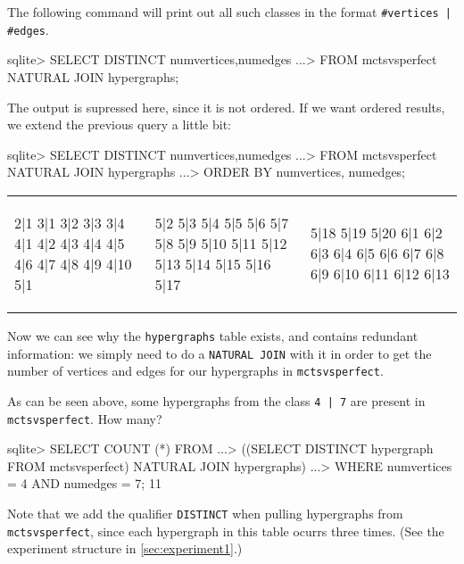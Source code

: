 The following command will print out all such classes in the format \texttt{\#vertices | \#edges}.
\begin{code}
sqlite> SELECT DISTINCT numvertices,numedges
   ...> FROM mctsvsperfect NATURAL JOIN hypergraphs;
\end{code}
The output is supressed here, since it is not ordered.
If we want ordered results, we extend the previous query a little bit:
\begin{code}
sqlite> SELECT DISTINCT numvertices,numedges
   ...> FROM mctsvsperfect NATURAL JOIN hypergraphs
   ...> ORDER BY numvertices, numedges;
\end{code}

\begin{tabular}{| p{0.5in} | p{0.5in} | p{0.5in} |}
\begin{minipage}{0.5in}
\begin{datalisting}
2|1
3|1
3|2
3|3
3|4
4|1
4|2
4|3
4|4
4|5
4|6
4|7
4|8
4|9
4|10
5|1
\end{datalisting}
\end{minipage}
&
\begin{minipage}{0.5in}
\begin{datalisting}
5|2
5|3
5|4
5|5
5|6
5|7
5|8
5|9
5|10
5|11
5|12
5|13
5|14
5|15
5|16
5|17
\end{datalisting}
\end{minipage}
&
\begin{minipage}{0.5in}
\begin{datalisting}
5|18
5|19
5|20
6|1
6|2
6|3
6|4
6|5
6|6
6|7
6|8
6|9
6|10
6|11
6|12
6|13
\end{datalisting}
\end{minipage}
\\
\end{tabular}

Now we can see why the \texttt{hypergraphs} table exists, and contains redundant information: we simply need to do a \texttt{NATURAL JOIN} with it in order to get the number of vertices and edges for our hypergraphs in \texttt{mctsvsperfect}.

As can be seen above, some hypergraphs from the class \texttt{4 | 7} are present in \texttt{mctsvsperfect}. How many?
\begin{code}
sqlite> SELECT COUNT (*) FROM
   ...> ((SELECT DISTINCT hypergraph FROM mctsvsperfect) NATURAL JOIN hypergraphs)
   ...> WHERE numvertices = 4 AND numedges = 7;
11
\end{code}
Note that we add the qualifier \texttt{DISTINCT} when pulling hypergraphs from \texttt{mctsvsperfect}, since each hypergraph in this table ocurrs three times. (See the experiment structure in \ref{sec:experiment1}.)

